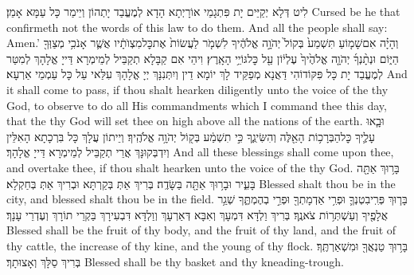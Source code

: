 {לִיט דְּלָא יְקַיֵּים יָת פִּתְגָמֵי אוֹרָיְתָא הָדָא לְמֶעֱבַד יָתְהוֹן וְיֵימַר כָּל עַמָּא אָמֵן׃}
{Cursed be he that confirmeth not the words of this law to do them. And all the people shall say: Amen.’}{}
\newperek
{}
{וְהָיָ֗ה אִם\maqqaf שָׁמ֤וֹעַ תִּשְׁמַע֙ בְּקוֹל֙ יְהֹוָ֣ה אֱלֹהֶ֔יךָ לִשְׁמֹ֤ר לַעֲשׂוֹת֙ אֶת\maqqaf כׇּל\maqqaf מִצְוֺתָ֔יו אֲשֶׁ֛ר אָנֹכִ֥י מְצַוְּךָ֖ הַיּ֑וֹם וּנְתָ֨נְךָ֜ יְהֹוָ֤ה אֱלֹהֶ֙יךָ֙ עֶלְי֔וֹן עַ֖ל כׇּל\maqqaf גּוֹיֵ֥י הָאָֽרֶץ׃}
{וִיהֵי אִם קַבָּלָא תְקַבֵּיל לְמֵימְרָא דַּייָ אֱלָהָךְ לְמִטַּר לְמֶעֱבַד יָת כָּל פִּקּוֹדוֹהִי דַּאֲנָא מְפַקֵּיד לָךְ יוֹמָא דֵין וְיִתְּנִנָּךְ יְיָ אֱלָהָךְ עִלַּאי עַל כָּל עַמְמֵי אַרְעָא׃}
{And it shall come to pass, if thou shalt hearken diligently unto the voice of the \lord\space thy God, to observe to do all His commandments which I command thee this day, that the \lord\space thy God will set thee on high above all the nations of the earth.}{}
{וּבָ֧אוּ עָלֶ֛יךָ כׇּל\maqqaf הַבְּרָכ֥וֹת הָאֵ֖לֶּה וְהִשִּׂיגֻ֑ךָ כִּ֣י תִשְׁמַ֔ע בְּק֖וֹל יְהֹוָ֥ה אֱלֹהֶֽיךָ׃}
{וְיֵיתוֹן עֲלָךְ כָּל בִּרְכָתָא הָאִלֵּין וְיִדְבְּקוּנָּךְ אֲרֵי תְקַבֵּיל לְמֵימְרָא דַּייָ אֱלָהָךְ׃}
{And all these blessings shall come upon thee, and overtake thee, if thou shalt hearken unto the voice of the \lord\space thy God.}{}
{בָּר֥וּךְ אַתָּ֖ה בָּעִ֑יר וּבָר֥וּךְ אַתָּ֖ה בַּשָּׂדֶֽה׃}
{בְּרִיךְ אַתְּ בְּקַרְתָּא וּבְרִיךְ אַתְּ בְּחַקְלָא׃}
{Blessed shalt thou be in the city, and blessed shalt thou be in the field.}{}
{בָּר֧וּךְ פְּרִֽי\maqqaf בִטְנְךָ֛ וּפְרִ֥י אַדְמָתְךָ֖ וּפְרִ֣י בְהֶמְתֶּ֑ךָ שְׁגַ֥ר אֲלָפֶ֖יךָ וְעַשְׁתְּר֥וֹת צֹאנֶֽךָ׃}
{בְּרִיךְ וַלְדָּא דִּמְעָךְ וְאִבָּא דְּאַרְעָךְ וְוַלְדָּא דִּבְעִירָךְ בַּקְרֵי תוֹרָךְ וְעֶדְרֵי עָנָךְ׃}
{Blessed shall be the fruit of thy body, and the fruit of thy land, and the fruit of thy cattle, the increase of thy kine, and the young of thy flock.}{}
{בָּר֥וּךְ טַנְאֲךָ֖ וּמִשְׁאַרְתֶּֽךָ׃}
{בְּרִיךְ סַלָּךְ וְאָצוּתָךְ׃}
{Blessed shall be thy basket and thy kneading-trough.}{}
